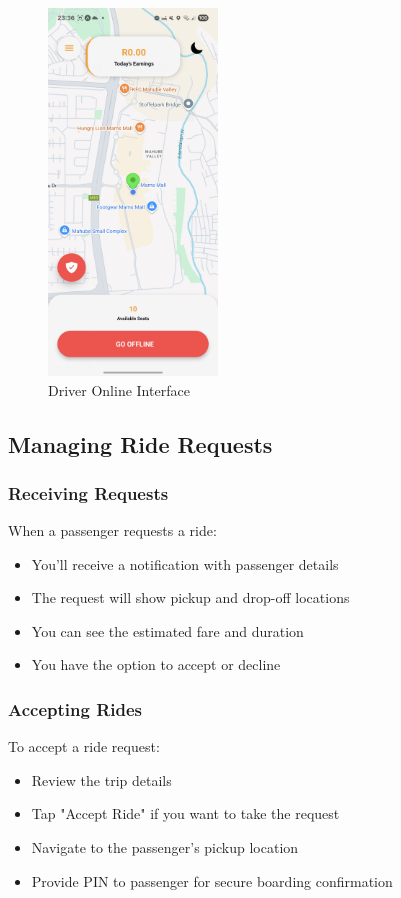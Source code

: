 \documentclass[12pt]{article}
\begin{document}
\begin{figure}[H]
  \centering
  \includegraphics[width=0.4\textwidth]{driver_online.png}
  \caption{Driver Online Interface}
\end{figure}


\subsection{Managing Ride Requests}
\subsubsection{Receiving Requests}
When a passenger requests a ride:
\begin{itemize}
    \item You'll receive a notification with passenger details
    \item The request will show pickup and drop-off locations
    \item You can see the estimated fare and duration
    \item You have the option to accept or decline
\end{itemize}

\subsubsection{Accepting Rides}
To accept a ride request:
\begin{itemize}
    \item Review the trip details
    \item Tap "Accept Ride" if you want to take the request
    \item Navigate to the passenger's pickup location
    \item Provide PIN to passenger for secure boarding confirmation
\end{itemize}
\end{document}
